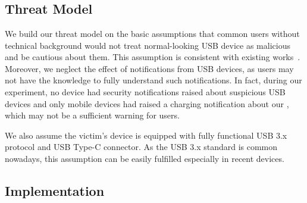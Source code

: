 \section{\tool}
\label{sec:badusb}
\subsection{Threat Model}

We build our threat model on the basic assumptions that common users without
technical background would not treat normal-looking USB device as malicious and be cautious about them. This assumption is consistent with existing works~\cite{JFCImpact}. Moreover, we neglect the
effect of notifications from USB devices, as users may not have the knowledge to fully understand such notifications. In
fact, during our experiment, no device had security notifications raised about
suspicious USB devices and only mobile devices had raised a charging notification
about our \tool, which may not be a sufficient warning for users.

We also assume the victim's device is equipped with fully functional USB 3.x
protocol and USB Type-C connector. As the USB 3.x standard is
common nowadays, this assumption can be easily fulfilled especially in recent
devices.


\subsection{Implementation}

